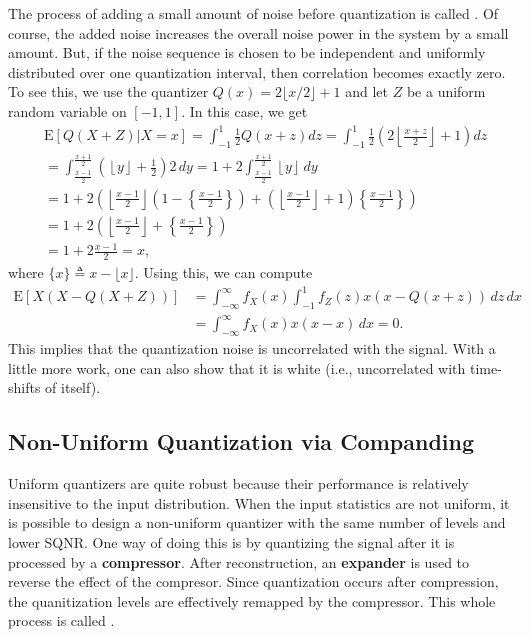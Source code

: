 The process of adding a small amount of noise before quantization is called .
Of course, the added noise increases the overall noise power in the system by a small amount.
But, if the noise sequence is chosen to be independent and uniformly distributed over one quantization interval, then correlation becomes exactly zero.
To see this, we use the quantizer $Q(x)=2\lfloor x/2 \rfloor + 1$ and let $Z$ be a uniform random variable on $[-1,1]$.
In this case, we get
\begin{align*}
& \mathrm{E} \left[Q(X+Z)|X=x \right]
= \int_{-1}^{1} \frac{1}{2} Q(x+z) dz
= \int_{-1}^{1} \frac{1}{2} \left( 2\left\lfloor \frac{x+z}{2} \right\rfloor + 1 \right) dz \\
&= \int_{\frac{x-1}{2}}^{\frac{x+1}{2}} \left( \left\lfloor y \right\rfloor + \frac{1}{2} \right) 2 \, dy
= 1 + 2 \int_{\frac{x-1}{2}}^{\frac{x+1}{2}} \left\lfloor y \right\rfloor \, dy \\
&= 1 + 2 \left( \left\lfloor \frac{x-1}{2} \right\rfloor \left( 1 - \left\{ \frac{x-1}{2} \right\} \right)
+ \left( \left\lfloor \frac{x-1}{2} \right\rfloor + 1 \right) \left\{\frac{x-1}{2}\right\} \right) \\
&= 1 + 2 \left( \left\lfloor \frac{x-1}{2} \right\rfloor + \left\{ \frac{x-1}{2} \right\} \right) \\
&= 1 + 2 \frac{x-1}{2}
= x,
\end{align*}
where $\{ x \} \triangleq x-\lfloor x \rfloor$.
Using this, we can compute
\begin{align*}
\mathrm{E} \left[X \left(X - Q(X+Z)\right) \right] 
&= \int_{-\infty}^{\infty} f_{X} (x) \int_{-1}^{1} f_{Z} (z) x(x - Q(x+z)) \, dz \, dx \\
&= \int_{-\infty}^{\infty} f_{X} (x) x(x - x) \, dx
= 0.
\end{align*}
This implies that the quantization noise is uncorrelated with the signal.
With a little more work, one can also show that it is white (i.e., uncorrelated with time-shifts of itself).


\subsection{Non-Uniform Quantization via Companding}

Uniform quantizers are quite robust because their performance is relatively insensitive to the input distribution.
When the input statistics are not uniform, it is possible to design a non-uniform quantizer with the same number of levels and lower SQNR.
One way of doing this is by quantizing the signal after it is processed by a \textbf{compressor}.
After reconstruction, an \textbf{expander} is used to reverse the effect of the compresor.
Since quantization occurs after compression, the quanitization levels are effectively remapped by the compressor.
This whole process is called .

